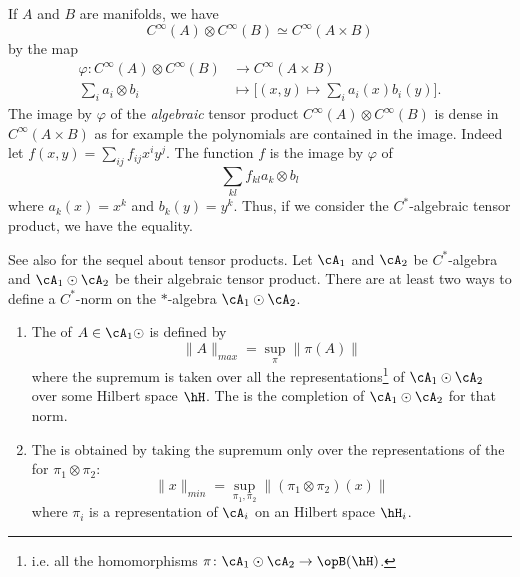 If $A$ and $B$ are manifolds, we have
\begin{equation}
    C^{\infty}(A)\otimes C^{\infty}(B)\simeq C^{\infty}(A\times B)
\end{equation}
by the map
\begin{equation}        \label{EqIsoCABCACBCstar}
    \begin{aligned}
        \varphi\colon  C^{\infty}(A)\otimes C^{\infty}(B)&\to  C^{\infty}(A\times B) \\
        \sum_ia_i\otimes b_i&\mapsto \Big[ (x,y)\mapsto\sum_ia_i(x)b_i(y) \Big].
    \end{aligned}
\end{equation}
The image by $\varphi$ of the \emph{algebraic} tensor product $ C^{\infty}(A)\otimes C^{\infty}(B)$ is dense in $ C^{\infty}(A\times B)$ as for example the polynomials are contained in the image. Indeed let $f(x,y)=\sum_{ij}f_{ij}x^iy^j$. The function $f$ is the image by $\varphi$ of
\begin{equation}        \label{EqDecompffklCABCACB}
    \sum_{kl} f_{kl} a_k\otimes b_l
\end{equation}
where $a_k(x)=x^k$ and $b_k(y)=y^k$. Thus, if we consider the $C^*$-algebraic tensor product, we have the equality.

See also \cite{Delaroche} for the sequel about tensor products. Let $\cA_1$ and $\cA_2$ be $C^*$-algebra and $\cA_1\odot\cA_2$ be their algebraic tensor product. There are at least two ways to define a $C^*$-norm on the $*$-algebra $\cA_1\odot\cA_2$.

\begin{enumerate}
    \item
        The  of $A\in\cA_1\odot$ is defined by
        \begin{equation}
            \| A \|_{max}=\sup_{\pi}\| \pi(A) \|
        \end{equation}
        where the supremum is taken over all the representations\footnote{i.e. all the homomorphisms $\pi\colon \cA_1\odot\cA_2\to \opB(\hH)$.} of $\cA_1\odot\cA_2$ over some Hilbert space $\hH$. The  is the completion of $\cA_1\odot\cA_2$ for that norm.

    \item
        The  is obtained by taking the supremum only over the representations of the for $\pi_1\otimes \pi_2$:
        \begin{equation}
            \| x \|_{min}=\sup_{\pi_1,\pi_2}\| (\pi_1\otimes\pi_2)(x) \|
        \end{equation}
        where $\pi_i$ is a representation of $\cA_i$ on an Hilbert space $\hH_i$.
\end{enumerate}

